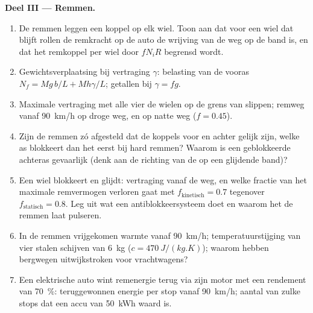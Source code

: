 \begin{problem}
\medskip
\noindent\textbf{Deel III --- Remmen.}
\begin{enumerate}[resume]
  \item De remmen leggen een koppel op elk wiel. Toon aan dat voor een
        wiel dat blijft rollen de remkracht op de auto de wrijving van de
        weg op de band is, en dat het remkoppel per wiel door $fN_iR$
        begrensd wordt.
  \item Gewichtsverplaatsing bij vertraging $\gamma$: belasting van de
        vooras $N_f = Mg\,b/L + Mh\gamma/L$; getallen bij $\gamma = fg$.
  \item Maximale vertraging met alle vier de wielen op de grens van
        slippen; remweg vanaf \qty{90}{km/h} op droge weg, en op natte weg
        ($f = 0.45$).
  \item Zijn de remmen zó afgesteld dat de koppels voor en achter gelijk
        zijn, welke as blokkeert dan het eerst bij hard remmen? Waarom is
        een geblokkeerde achteras gevaarlijk (denk aan de richting van de
         op een glijdende band)?
  \item Een wiel blokkeert en glijdt: vertraging vanaf de weg, en welke
        fractie van het maximale remvermogen verloren gaat met
        $f_{\text{kinetisch}} =
        0.7$ tegenover $f_{\text{statisch}} = 0.8$.
        Leg uit wat een antiblokkeersysteem doet en waarom het de remmen
        laat pulseren.
  \item In de remmen vrijgekomen warmte vanaf \qty{90}{km/h};
        temperatuurstijging van vier stalen schijven van \qty{6}{kg}
        ($c = \qty{470}{J/(kg.K)}$); waarom hebben bergwegen
        uitwijkstroken voor vrachtwagens?
  \item Een elektrische auto wint remenergie terug via zijn motor met een
        rendement van \qty{70}{\%}: teruggewonnen energie per stop vanaf
        \qty{90}{km/h}; aantal van zulke stops dat een accu van
        \qty{50}{kWh} waard is.
\end{enumerate}


\end{problem}
